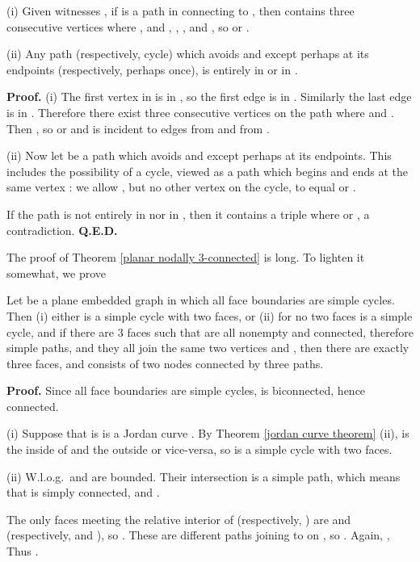 \begin{lemma}
\label{edges incident from H and K} {\rm (i)}
Given witnesses , if  is a path in 
connecting  to ,
then  contains three consecutive vertices  where
, and , ,
, and , so  or .

{\rm (ii)} Any path (respectively, cycle) which avoids  and  except
perhaps at its endpoints
(respectively, perhaps once), is entirely in 
or in .
\end{lemma}

{\bf Proof.} (i) The first vertex in  is in ,
so the first edge is in .  Similarly the last edge is in .
Therefore there exist three consecutive vertices 
on the path where  and .
Then , so  or  and  is
incident to edges from  and from .

(ii)
Now let  be a path which avoids  and 
except perhaps at its endpoints. This includes the
possibility of a cycle, viewed as a path which
begins and ends at the same vertex : we allow
, but no other vertex on the cycle, to equal
 or .

If the path is not entirely
in  nor in , then it contains a triple
 where  or , a contradiction. {\bf Q.E.D.}\medskip



The proof of
Theorem \ref{planar nodally 3-connected} is long.  To lighten
it somewhat, we prove

\begin{lemma}
\label{2 or 3 faces} Let  be a plane embedded graph in which all face
boundaries are simple cycles.  Then
{\rm (i)} either  is a simple cycle with two faces, or\hfil\break
{\rm (ii)} for no two faces  is  a simple
cycle, and
if there are 3 faces  such that
 are all nonempty and connected, therefore simple paths, and they all
join the same two vertices  and ,
then there are exactly three faces, and
 consists of two nodes connected by three paths.
\end{lemma}

{\bf Proof.} Since all face boundaries are simple cycles,
 is biconnected, hence connected.

(i) Suppose
  that
is  is a Jordan curve .
By Theorem \ref{jordan curve theorem} (ii),
 is the inside of  and  the outside
or vice-versa, so  is a simple cycle with two faces.

(ii)  W.l.o.g.\   and  are bounded.  Their
intersection  is a simple path, which means that
 is simply connected,
and .

The only faces meeting the relative interior of  (respectively, ) are
 and  (respectively,  and ), so .
These are different paths joining  to  on ,
so . Again, ,
Thus .

